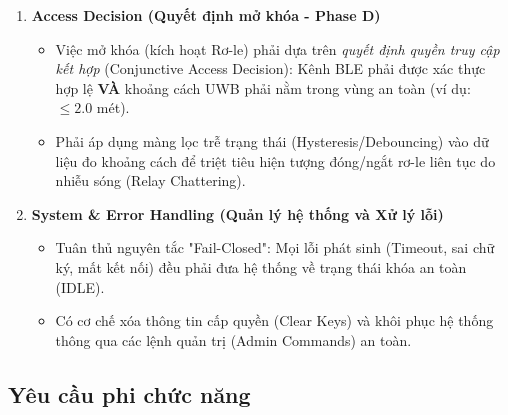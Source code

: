 \begin{enumerate}
    \item \textbf{Access Decision (Quyết định mở khóa - Phase D)}
    \begin{itemize}
        \item Việc mở khóa (kích hoạt Rơ-le) phải dựa trên \textit{quyết định quyền truy cập kết hợp} (Conjunctive Access Decision): Kênh BLE phải được xác thực hợp lệ \textbf{VÀ} khoảng cách UWB phải nằm trong vùng an toàn (ví dụ: $\le 2.0$ mét).
        \item Phải áp dụng màng lọc trễ trạng thái (Hysteresis/Debouncing) vào dữ liệu đo khoảng cách để triệt tiêu hiện tượng đóng/ngắt rơ-le liên tục do nhiễu sóng (Relay Chattering).
    \end{itemize}

    \item \textbf{System \& Error Handling (Quản lý hệ thống và Xử lý lỗi)}
    \begin{itemize}
        \item Tuân thủ nguyên tắc "Fail-Closed": Mọi lỗi phát sinh (Timeout, sai chữ ký, mất kết nối) đều phải đưa hệ thống về trạng thái khóa an toàn (IDLE).
        \item Có cơ chế xóa thông tin cấp quyền (Clear Keys) và khôi phục hệ thống thông qua các lệnh quản trị (Admin Commands) an toàn.
    \end{itemize}
\end{enumerate}

\subsection{Yêu cầu phi chức năng}

